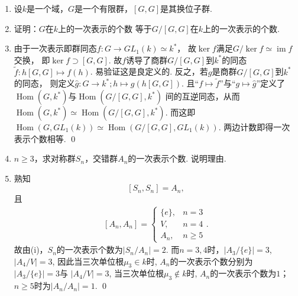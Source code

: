 \begin{enumerate}
\begin{remark}
    该习题的推广为Artin-Weddernburn定理,它说的是半单环分解为矩阵环的分解方式是存在且在同构意义下唯一的.
\end{remark}
\item[10.1] 设$k$是一个域，$G$是一个有限群，$[G,G]$是其换位子群.
    \item[(i)] 证明：$G$在$k$上的一次表示的个数
        等于$G/[G,G]$在$k$上的一次表示的个数.
    \item[\textbf{证明:}]
        由于一次表示即群同态$f:G \rightarrow GL_{1}(k) \simeq k^{*}$，
        故$\ker f$满足$G / \ker f \simeq \operatorname{im}f$交换，
        即$\ker f \supset [G,G]$. 故$f$诱导了商群$G/[G,G]$到$k^{*}$的同态
        $\tilde{f}: h[G,G] \mapsto f(h)$. 易验证这是良定义的.
        反之，若$g$是商群$G/[G,G]$到$k^{*}$的同态，
        则定义$\hat{g}:G \rightarrow k^{*};h \mapsto g(h[G,G])$. 
        且“$f \mapsto \tilde{f}$”与“$g \mapsto \hat{g}$”定义了
        $\operatorname{Hom}(G,k^{*})$与$\operatorname{Hom}(G/[G,G],k^{*})$
        间的互逆同态，从而
        $\operatorname{Hom}(G,k^{*}) \simeq \operatorname{Hom}(G/[G,G],k^{*})$.
        而这即$\operatorname{Hom}(G,GL_{1}(k)) 
        \simeq \operatorname{Hom}(G/[G,G],GL_{1}(k))$.
        两边计数即得一次表示个数相等. \qed
    \item[(ii)] $n \geq 3$，求对称群$S_{n}$，交错群$A_{n}$的一次表示个数. 说明理由.
    \item[\textbf{证明:}]
        熟知
        \[
            [S_{n},S_{n}] = A_{n},
        \]
        且
        \[\begin{aligned}
            [A_{n},A_{n}] = 
            \begin{cases}
                \{e\}, & n=3 \\
                V, & n=4 \\
                A_{n}, & n \geq 5
            \end{cases}.
        \end{aligned}\]
        故由(i)，$S_{n}$的一次表示个数为$|S_{n}/A_{n}|=2$.
        而$n=3,4$时，$|A_{3}/\{e\}|=3$,
        $|A_{4}/V|=3$, 因此当三次单位根$\mu_3\in k$时, $A_{n}$的一次表示个数分别为$|A_{3}/\{e\}|=3$与
        $|A_{4}/V|=3$, 当三次单位根$\mu_3 \notin k$时, $A_n$的一次表示个数为$1$；$n \geq 5$时为$|A_{n}/A_{n}|=1$. \qed


\end{enumerate}
